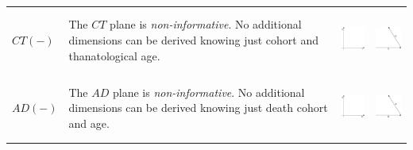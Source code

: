 \documentclass[
  12pt
]{scrartcl}
\begin{document}
\begin{center}
\begin{longtable}{m{}m{}m{}m{}}
  $CT(-)$ &
  The $CT$ plane is \emph{non-informative}. No additional dimensions can be derived knowing just cohort and thanatological age. &
  \includegraphics[height = 2cm]{../fig/CT.pdf} &
  \includegraphics[height = 2cm]{../fig/CT_iso.pdf}  \\
  $AD(-)$ &
  The $AD$ plane is \emph{non-informative}. No additional dimensions can be derived knowing just death cohort and age. &
  \includegraphics[height = 2cm]{../fig/AD.pdf} &
  \includegraphics[height = 2cm]{../fig/AD_iso.pdf}  \\
  \bottomrule
  \end{longtable}
\end{center}

\clearpage
\end{document}
